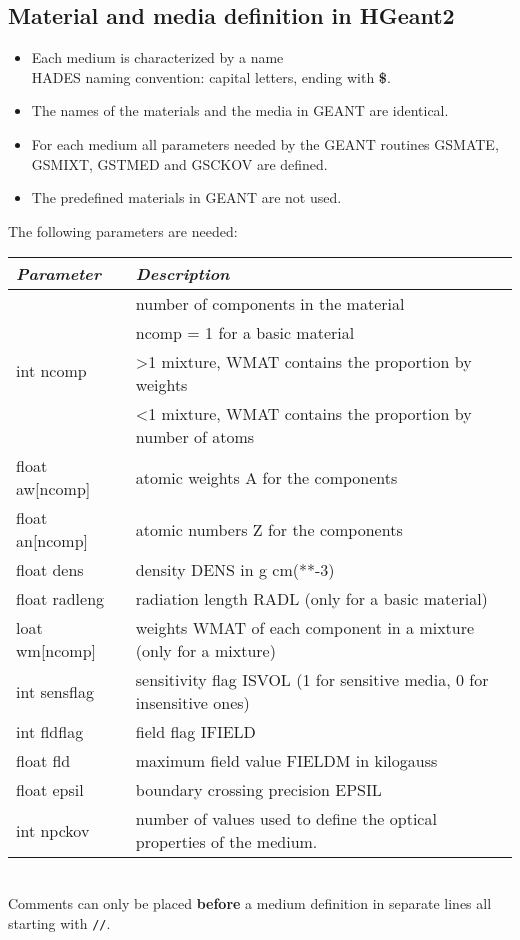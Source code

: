 \subsection[Material and media definition in HGeant2]{Material and media definition in HGeant2}\label{sec:geomMedia}
\begin{itemize}
 \item Each medium is characterized by a name\\
       HADES naming convention: capital letters, ending with \textbf{\$}.
 \item The names of the materials and the media in GEANT are identical.
 \item For each medium all parameters needed by the GEANT routines GSMATE, GSMIXT, GSTMED and GSCKOV are defined.
 \item The predefined materials in GEANT are not used.
\end{itemize}

The following parameters are needed:\\
\begin{tabular}{|l|l|}
  \hline
  \cellcolor{lightgray} \textit{Parameter} & \cellcolor{lightgray} \textit{Description}\\
  \hline
  \multirow{4}{*}{int ncomp} & number of components in the material\\
                             & ncomp = 1 for a basic material\\
                             & \textgreater 1 mixture, WMAT contains the proportion by weights\\
                             & \textless 1 mixture, WMAT contains the proportion by number of atoms\\
  \hline
  float aw[ncomp]            & atomic weights A for the components\\
  \hline
  float an[ncomp]            & atomic numbers Z for the components\\
  \hline
  float dens                 & density DENS in g cm(**-3)\\
  \hline
  float radleng              & radiation length RADL (only for a basic material)\\
  \hline
  loat wm[ncomp]             & weights WMAT of each component in a mixture (only for a mixture)\\
  \hline
  int sensflag               & sensitivity flag ISVOL (1 for sensitive media, 0 for insensitive ones)\\
  \hline
  int fldflag                & field flag IFIELD\\
  \hline
  float fld                  & maximum field value FIELDM in kilogauss\\
  \hline
  float epsil                & boundary crossing precision EPSIL\\
  \hline
  int npckov                 & number of values used to define the optical properties of the medium.\\
  \hline
\end{tabular}\\[1.5ex]
Comments can only be placed \textbf{before} a medium definition in separate lines all starting with \verb+//+.\\


